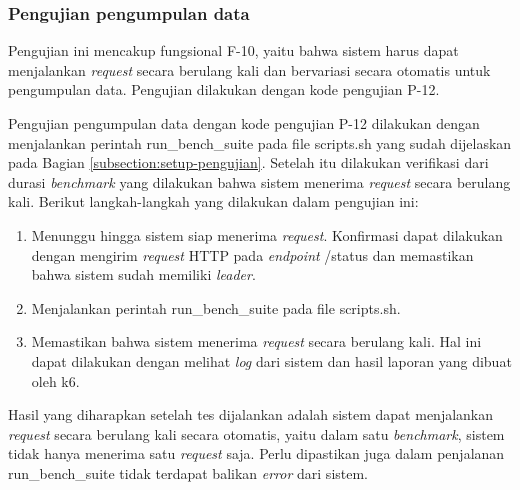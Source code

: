 \subsubsection{Pengujian pengumpulan data}
\label{subsubsection:pengujian-pengumpulan-data}

Pengujian ini mencakup fungsional F-10, yaitu bahwa sistem harus dapat menjalankan \textit{request} secara berulang kali dan bervariasi secara otomatis untuk pengumpulan data. Pengujian dilakukan dengan kode pengujian P-12. 


Pengujian pengumpulan data dengan kode pengujian P-12 dilakukan dengan menjalankan perintah run\_bench\_suite pada file scripts.sh yang sudah dijelaskan pada Bagian \ref{subsection:setup-pengujian}. Setelah itu dilakukan verifikasi dari durasi \textit{benchmark} yang dilakukan bahwa sistem menerima \textit{request} secara berulang kali. Berikut langkah-langkah yang dilakukan dalam pengujian ini:

\begin{enumerate}
    \item Menunggu hingga sistem siap menerima \textit{request}. Konfirmasi dapat dilakukan dengan mengirim \textit{request} HTTP pada \textit{endpoint} /status dan memastikan bahwa sistem sudah memiliki \textit{leader}.
    \item Menjalankan perintah run\_bench\_suite pada file scripts.sh.
    \item Memastikan bahwa sistem menerima \textit{request} secara berulang kali. Hal ini dapat dilakukan dengan melihat \textit{log} dari sistem dan hasil laporan yang dibuat oleh k6.
\end{enumerate}

Hasil yang diharapkan setelah tes dijalankan adalah sistem dapat menjalankan \textit{request} secara berulang kali secara otomatis, yaitu dalam satu \textit{benchmark}, sistem tidak hanya menerima satu \textit{request} saja. Perlu dipastikan juga dalam penjalanan run\_bench\_suite tidak terdapat balikan \textit{error} dari sistem.